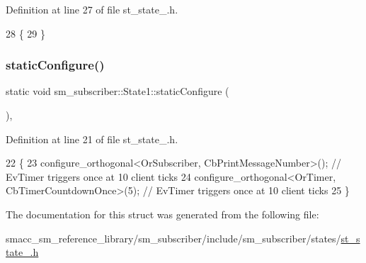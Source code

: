 Definition at line 27 of file st\+\_\+state\+\_.\+h.


\begin{DoxyCode}
28   \{
29   \}
\end{DoxyCode}
\mbox{\label{structsm__subscriber_1_1State1_ae878310b93e6fb33efaf0a2d53533dc0}} 
\subsubsection{\texorpdfstring{static\+Configure()}{staticConfigure()}}
{\footnotesize\ttfamily static void sm\+\_\+subscriber\+::\+State1\+::static\+Configure (\begin{DoxyParamCaption}{ }\end{DoxyParamCaption})\hspace{0.3cm}{\ttfamily [inline]}, {\ttfamily [static]}}



Definition at line 21 of file st\+\_\+state\+\_.\+h.


\begin{DoxyCode}
22   \{
23       configure\_orthogonal<OrSubscriber, CbPrintMessageNumber>();  \textcolor{comment}{// EvTimer triggers once at 10 client
       ticks}
24       configure\_orthogonal<OrTimer, CbTimerCountdownOnce>(5); \textcolor{comment}{// EvTimer triggers once at 10 client ticks}
25   \}
\end{DoxyCode}


The documentation for this struct was generated from the following file\+:\begin{DoxyCompactItemize}
\item 
smacc\+\_\+sm\+\_\+reference\+\_\+library/sm\+\_\+subscriber/include/sm\+\_\+subscriber/states/\hyperlink{sm__subscriber_2include_2sm__subscriber_2states_2st__state__1_8h}{st\+\_\+state\+\_.\+h}\end{DoxyCompactItemize}
